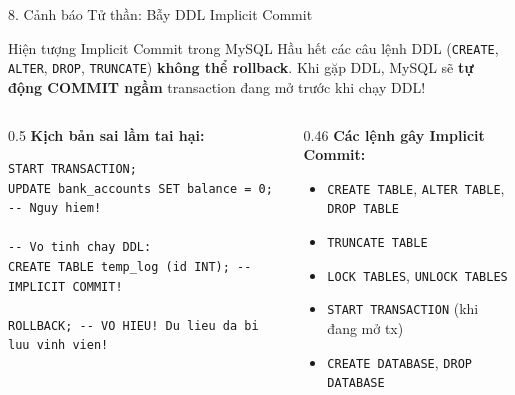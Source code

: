 \documentclass[aspectratio=169,11pt]{beamer}
\newcommand{\code}[1]{\texttt{#1}}
\begin{document}
\begin{frame}[fragile]{8. Cảnh báo Tử thần: Bẫy DDL Implicit Commit}
  \begin{alertblock}{Hiện tượng Implicit Commit trong MySQL}
    Hầu hết các câu lệnh DDL (\code{CREATE}, \code{ALTER}, \code{DROP}, \code{TRUNCATE}) \textbf{không thể rollback}. Khi gặp DDL, MySQL sẽ \textbf{tự động COMMIT ngầm} transaction đang mở trước khi chạy DDL!
  \end{alertblock}
  \vspace{0.2em}
  \begin{columns}[T]
    \begin{column}{0.5\textwidth}
      \textbf{Kịch bản sai lầm tai hại:}
\begin{lstlisting}
START TRANSACTION;
UPDATE bank_accounts SET balance = 0; -- Nguy hiem!

-- Vo tinh chay DDL:
CREATE TABLE temp_log (id INT); -- IMPLICIT COMMIT!

ROLLBACK; -- VO HIEU! Du lieu da bi luu vinh vien!
\end{lstlisting}
    \end{column}
    \begin{column}{0.46\textwidth}
      \textbf{Các lệnh gây Implicit Commit:}
      \begin{itemize}
        \item \code{CREATE TABLE}, \code{ALTER TABLE}, \code{DROP TABLE}
        \item \code{TRUNCATE TABLE}
        \item \code{LOCK TABLES}, \code{UNLOCK TABLES}
        \item \code{START TRANSACTION} (khi đang mở tx)
        \item \code{CREATE DATABASE}, \code{DROP DATABASE}
      \end{itemize}
    \end{column}
  \end{columns}
\end{frame}
\end{document}
